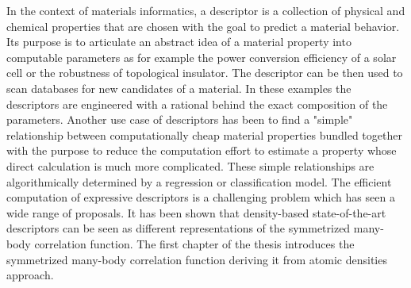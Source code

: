 In the context of materials informatics, a descriptor is a collection of
physical and chemical properties that are chosen with the goal to predict a
material behavior.  Its purpose is to articulate an abstract idea of a material
property into computable parameters\cite{curtarolo2013high} as for example the
power conversion efficiency of a solar cell\cite{yu2012identification} or the
robustness of topological insulator\cite{yang2012search}.  The descriptor can
be then used to scan databases for new candidates of a material.  In these
examples the descriptors are engineered with a rational behind the exact
composition of the parameters.  Another use case of descriptors has been to
find a "simple" relationship between computationally cheap material properties
bundled together with the purpose to reduce the computation effort to estimate
a property whose direct calculation is much more complicated.  These simple
relationships are algorithmically determined by a regression or classification
model.%
The efficient computation of expressive descriptors is a challenging problem
which has seen a wide range of proposals\cite{behler2011atom, rupp2012fast,
bartok2013representing, huo2017unified}.  It has been shown that density-based
state-of-the-art descriptors can be seen as different representations of the
symmetrized many-body correlation function\cite{willatt2019atom}.
The first chapter of the thesis introduces the symmetrized many-body correlation function deriving it from atomic densities approach.

